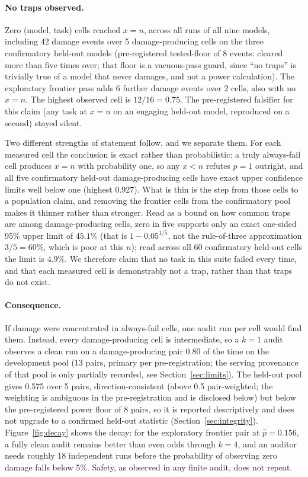 \documentclass{article}
\newcommand{\phat}{\ensuremath{\hat{p}}}
\begin{document}
\paragraph{No traps observed.} Zero (model, task) cells reached $x = n$, across all
runs of all nine models, including 42 damage events over 5 damage-producing cells
on the three confirmatory held-out models (pre-registered tested-floor of 8
events: cleared more than five
times over; that floor is a vacuous-pass guard, since ``no traps'' is trivially
true of a model that never damages, and not a power calculation). The exploratory
frontier pass adds 6 further damage events over 2 cells, also with no $x = n$.
The highest
observed cell is $12/16 = 0.75$. The pre-registered falsifier for this claim (any
task at $x = n$ on an engaging held-out model, reproduced on a second) stayed
silent.

Two different strengths of statement follow, and we separate them. For each
measured cell the conclusion is exact rather than probabilistic: a truly
always-fail cell produces $x = n$ with probability one, so any $x < n$ refutes
$p = 1$ outright, and all five confirmatory held-out damage-producing cells have
exact upper
confidence limits well below one (highest $0.927$). What is thin is the step from
those cells to a population claim, and removing the frontier cells from the
confirmatory pool makes it thinner rather than stronger. Read as a bound on how
common traps are among
damage-producing cells, zero in five supports only an exact one-sided 95\% upper
limit of $45.1\%$ (that is $1 - 0.05^{1/5}$, not the rule-of-three approximation
$3/5 = 60\%$, which is poor at this $n$); read across all 60 confirmatory
held-out cells the
limit is $4.9\%$. We therefore claim that no task in this suite failed every time,
and that each measured cell is demonstrably not a trap, rather than that traps do
not exist.

\paragraph{Consequence.} If damage were concentrated in always-fail cells, one
audit run per cell would find them. Instead, every damage-producing cell is
intermediate, so a $k=1$ audit observes a clean run on a damage-producing pair
0.80 of the time on the development pool (13 pairs, primary per
pre-registration; the serving provenance of that pool is only partially
recorded, see Section~\ref{sec:limits}). The held-out pool gives 0.575 over 5 pairs,
direction-consistent (above 0.5 pair-weighted; the weighting is ambiguous in the
pre-registration and is disclosed below) but below the pre-registered power floor of 8
pairs, so it is reported descriptively and does not upgrade to a confirmed
held-out statistic (Section~\ref{sec:integrity}). Figure~\ref{fig:decay} shows
the decay: for the exploratory frontier pair at $\phat = 0.156$, a fully clean
audit remains
better than even odds through $k = 4$, and an auditor needs roughly 18
independent runs before the probability of observing zero damage falls below 5\%.
Safety, as observed in any finite audit, does not repeat.
\end{document}
